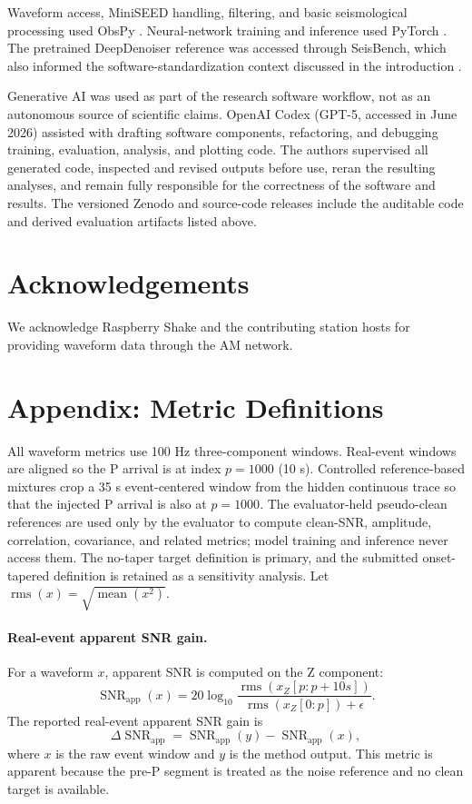 \documentclass[review,12pt,authoryear]{elsarticle}
\begin{document}
Waveform access, MiniSEED handling, filtering, and basic seismological processing used ObsPy \citep{krischer2015}. Neural-network training and inference used PyTorch \citep{paszke2019}. The pretrained DeepDenoiser reference was accessed through SeisBench, which also informed the software-standardization context discussed in the introduction \citep{woollam2022,zhu2019}.

Generative AI was used as part of the research software workflow, not as an autonomous source of scientific claims. OpenAI Codex (GPT-5, accessed in June 2026) assisted with drafting software components, refactoring, and debugging training, evaluation, analysis, and plotting code. The authors supervised all generated code, inspected and revised outputs before use, reran the resulting analyses, and remain fully responsible for the correctness of the software and results. The versioned Zenodo and source-code releases include the auditable code and derived evaluation artifacts listed above.

\section*{Acknowledgements}
We acknowledge Raspberry Shake and the contributing station hosts for providing waveform data through the AM network.

\FloatBarrier
\clearpage
\appendix
\section*{Appendix: Metric Definitions}
\label{app:metrics}
All waveform metrics use 100 Hz three-component windows. Real-event windows are aligned so the P arrival is at index $p=1000$ (10 s). Controlled reference-based mixtures crop a 35 s event-centered window from the hidden continuous trace so that the injected P arrival is also at $p=1000$. The evaluator-held pseudo-clean references are used only by the evaluator to compute clean-SNR, amplitude, correlation, covariance, and related metrics; model training and inference never access them. The no-taper target definition is primary, and the submitted onset-tapered definition is retained as a sensitivity analysis. Let $\operatorname{rms}(x)=\sqrt{\operatorname{mean}(x^2)}$.

\paragraph{Real-event apparent SNR gain.}
For a waveform $x$, apparent SNR is computed on the Z component:
\begin{equation}
\operatorname{SNR}_{\operatorname{app}}(x)
=20\log_{10}
\frac{\operatorname{rms}(x_Z[p:p+10s])}
{\operatorname{rms}(x_Z[0:p])+\epsilon}.
\end{equation}
The reported real-event apparent SNR gain is
\begin{equation}
\Delta\operatorname{SNR}_{\operatorname{app}}
=\operatorname{SNR}_{\operatorname{app}}(y)
-\operatorname{SNR}_{\operatorname{app}}(x),
\end{equation}
where $x$ is the raw event window and $y$ is the method output. This metric is apparent because the pre-P segment is treated as the noise reference and no clean target is available.
\end{document}
